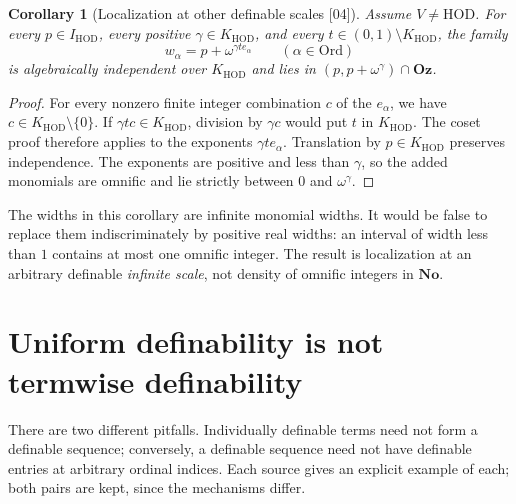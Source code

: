 \documentclass[11pt,a4paper]{article}
\numberwithin{equation}{section}
\newtheorem{corollary}[corollary]{Corollary}
\theoremstyle{definition}
\theoremstyle{remark}
\newcommand{\No}{\mathbf{No}}
\newcommand{\Oz}{\mathbf{Oz}}
\newcommand{\Ord}{\mathrm{Ord}}
\newcommand{\HOD}{\mathrm{HOD}}
\newcommand{\KH}{K_{\HOD}}
\newcommand{\IH}{I_{\HOD}}
\newcommand{\src}[1]{\textup{\textsf{\small[#1]}}}
\begin{document}
\begin{corollary}[Localization at other definable scales \src{04}]
\label{dsn:cor:localize}
Assume $V\ne\HOD$. For every $p\in\IH$, every positive
$\gamma\in\KH$, and every $t\in(0,1)\setminus\KH$, the family
\begin{equation}\label{dsn:eq:localfam}
 w_\alpha=p+\omega^{\gamma t e_\alpha}\qquad(\alpha\in\Ord)
\end{equation}
is algebraically independent over $\KH$ and lies in
$(p,p+\omega^\gamma)\cap\Oz$.
\end{corollary}
\begin{proof}
For every nonzero finite integer combination $c$ of the $e_\alpha$,
we have $c\in\KH\setminus\{0\}$. If $\gamma tc\in\KH$, division
by $\gamma c$ would put $t$ in $\KH$. The coset proof therefore
applies to the exponents $\gamma te_\alpha$. Translation by
$p\in\KH$ preserves independence. The exponents are positive and
less than $\gamma$, so the added monomials are omnific and lie
strictly between $0$ and $\omega^\gamma$.
\end{proof}

The widths in this corollary are infinite monomial widths. It would
be false to replace them indiscriminately by positive real widths:
an interval of width less than $1$ contains at most one omnific
integer. The result is localization at an arbitrary definable
\emph{infinite scale}, not density of omnific integers in $\No$.

\section{Uniform definability is not termwise definability}
\label{dsn:sec:uniformity}

There are two different pitfalls. Individually definable terms need
not form a definable sequence; conversely, a definable sequence need
not have definable entries at arbitrary ordinal indices. Each source
gives an explicit example of each; both pairs are kept, since the
mechanisms differ.
\end{document}
